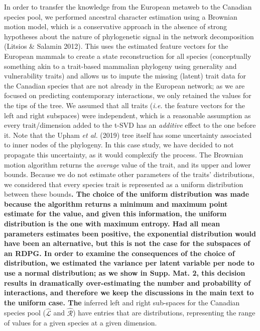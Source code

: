\documentclass[11pt]{article}
\makeatletter
\def\maxwidth{\ifdim\Gin@nat@width>\linewidth\linewidth
\else\Gin@nat@width\fi}
\let\Oldincludegraphics\includegraphics
\renewcommand{\includegraphics}[1]{\Oldincludegraphics[width=\maxwidth]{#1}}
\providecommand{\DIFaddtex}[1]{{\bf #1}} %
\providecommand{\DIFdeltex}[1]{} %
\providecommand{\DIFaddbegin}{\protect\color{blue}} %
\providecommand{\DIFaddend}{\protect\color{black}} %
\providecommand{\DIFdelbegin}{\protect\color{red}} %
\providecommand{\DIFdelend}{\protect\color{black}} %
\providecommand{\DIFadd}[1]{\texorpdfstring{\DIFaddtex{#1}}{#1}} %
\providecommand{\DIFdel}[1]{\texorpdfstring{\DIFdeltex{#1}}{}} %
\newcommand{\DIFscaledelfig}{0.5}
\newlength{\DIFdelgraphicswidth} %
\newlength{\DIFdelgraphicsheight} %
\newcommand{\DIFaddincludegraphics}[2][]{{\color{blue}\fbox{\DIFOincludegraphics[#1]{#2}}}} %
\newcommand{\DIFdelincludegraphics}[2][]{%
\sbox{\DIFdelgraphicsbox}{\DIFOincludegraphics[#1]{#2}}%
\settoboxwidth{\DIFdelgraphicswidth}{\DIFdelgraphicsbox} %
\settoboxtotalheight{\DIFdelgraphicsheight}{\DIFdelgraphicsbox} %
\scalebox{\DIFscaledelfig}{%
\parbox[b]{\DIFdelgraphicswidth}{\usebox{\DIFdelgraphicsbox}\\[-\baselineskip] \rule{\DIFdelgraphicswidth}{0em}}\llap{\resizebox{\DIFdelgraphicswidth}{\DIFdelgraphicsheight}{%
\setlength{\unitlength}{\DIFdelgraphicswidth}%
\begin{picture}(1,1)%
\thicklines\linethickness{2pt} %
{\color[rgb]{1,0,0}\put(0,0){\framebox(1,1){}}}%
{\color[rgb]{1,0,0}\put(0,0){\line( 1,1){1}}}%
{\color[rgb]{1,0,0}\put(0,1){\line(1,-1){1}}}%
\end{picture}%
}\hspace*{3pt}}} %
} %
\DeclareRobustCommand{\DIFaddbegin}{\DIFOaddbegin \let\includegraphics\DIFaddincludegraphics} %
\DeclareRobustCommand{\DIFaddend}{\DIFOaddend \let\includegraphics\DIFOincludegraphics} %
\DeclareRobustCommand{\DIFdelbegin}{\DIFOdelbegin \let\includegraphics\DIFdelincludegraphics} %
\DeclareRobustCommand{\DIFdelend}{\DIFOaddend \let\includegraphics\DIFOincludegraphics} %
\makeatother
\begin{document}
In order to transfer the knowledge from the European metaweb to the
Canadian species pool, we performed ancestral character estimation using
a Brownian motion model, which is a conservative approach in the absence
of strong hypotheses about the nature of phylogenetic signal in the
network decomposition (Litsios \& Salamin 2012). This uses the estimated
feature vectors for the European mammals to create a state
reconstruction for all species (conceptually something akin to a
trait-based mammalian phylogeny using generality and vulnerability
traits) and allows us to impute the missing (latent) trait data for the
Canadian species that are not already in the European network; as we are
focused on predicting contemporary interactions, we only retained the
values for the tips of the tree. We assumed that all traits (\emph{i.e.}
the feature vectors for the left and right subspaces) were independent,
which is a reasonable assumption as every trait/dimension added to the
t-SVD has an \emph{additive} effect to the one before it. Note that the
Upham \emph{et al.} (2019) tree itself has some uncertainty associated
to inner nodes of the phylogeny. In this case study, we have decided to
not propagate this uncertainty, as it would complexify the process. The
Brownian motion algorithm returns the \emph{average} value of the trait,
and its upper and lower bounds. Because we do not estimate other
parameters of the traits' distributions, we considered that every
species trait is represented as a uniform distribution between these
bounds\DIFdelbegin \DIFdel{; in a situation where the
algorithm would return point values for all simulations,
one could in theory either estimate the parameters of a
distribution for each tip, or draw randomly from the outputs. In all
cases, the }\DIFdelend \DIFaddbegin \DIFadd{. The choice of the uniform distribution was made because the
algorithm returns a minimum and maximum point estimate for the value,
and given this information, the uniform distribution is the one with
maximum entropy. Had all mean parameters estimates been positive, the
exponential distribution would have been an alternative, but this is not
the case for the subspaces of an RDPG. In order to examine the
consequences of the choice of distribution, we estimated the variance
per latent variable per node to use a normal distribution; as we show in
Supp. Mat. 2, this decision results in dramatically over-estimating the
number and probability of interactions, and therefore we keep the
discussions in the main text to the uniform case. The }\DIFaddend inferred left and
right sub-spaces for the Canadian species pool (\(\hat{\mathscr{L}}\)
and \(\hat{\mathscr{R}}\)) have entries that are distributions,
representing the range of values for a given species at a given
dimension.
\end{document}
